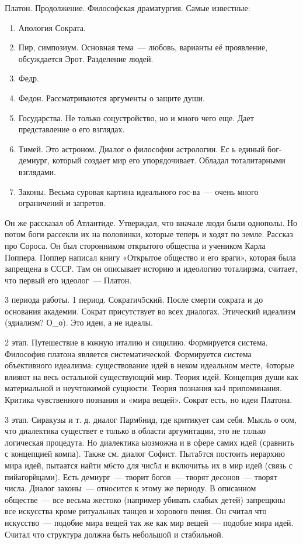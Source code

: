 Платон. Продолжение. 
Философская драматургия. 
Самые известные:

\begin{enumerate} 
	\item Апология Сократа. 
	\item Пир, симпозиум. Основная тема~--- любовь, варианты её проявление, обсуждается Эрот. Разделение людей. 
	\item Федр. 
	\item Федон. Рассматриваются аргументы о защите души. 
	\item Государства. Не только соцустройство, но и много чего еще. Дает представление о его взглядах. 
	\item Тимей. Это астроном. Диалог о философии астрологии. Ес ь единый бог-демиург, который создает мир его упорядочивает. Обладал тоталитарными взглядами. 
	\item Законы. Весьма суровая картина идеального гос-ва~--- очень много ограничений и запретов.
\end{enumerate}

Он же рассказал об Атлантиде. 
Утверждал, что вначале люди были однополы. Но потом боги рассекли их на половинки, которые теперь и ходят по земле. 
Рассказ про Сороса. Он был сторонником открытого общества и учеником Карла Поппера. 
Поппер написал книгу «Открытое общество и его враги», которая была запрещена в СССР. 
Там он описывает историю и идеологию тоталирзма, считает, что первый его идеолог~--- Платон. 

3 периода работы. 
1 период. Сократич5ский. После смерти сократа и до основания академии. Сократ присутствует во всех диалогах. Этический идеализм (эдиализм? О_о). Это идеи, а не идеалы. 

2 этап. Путешествие в южную италию и сицилию. Формируется система. Философия платона является систематической. 
Формируется система объективного идеализма: существование идей в неком идеальном месте, 4оторые влияют на весь остальной существующий мир. Теория идей. Концепция души как материальной и неучтожимой сущности. 
Теория познания ка4 припоминания. Критика чувственного познания и «мира вещей». Сократ есть, но идеи Платона. 

3 этап. Сиракузы и т. д. диалог Парм6нид, где критикует сам себя. Мысль о оом, что диалектика существет е только в области аргумнтации, это не тллько логическая процедута. 
Но диалектика ыозможна и в сфере самих идей (сравнить с концепцией компа). Также см. диалог Софист. Пыта5тся постоить иерархию мира идей, пытаатся найти м6сто для чис5л и включитьь их в мир идей (связь с пийагорйцами). 
Есть демиург~--- творит богов~--- творят десонов~--- творят числа. Диалог законы~--- относится к этому же периоду. 
В описанном обществе~--- все весьма жестоко (например убивать слабых детей) запрещкны все искусства кроме ритуальных танцев и хорового пения. 
Он считал что искусство~--- подобие мира вещей так же как мир вещей~--- подобие мира идей. Считал что структура должна быть небольшой и стабильной. 

